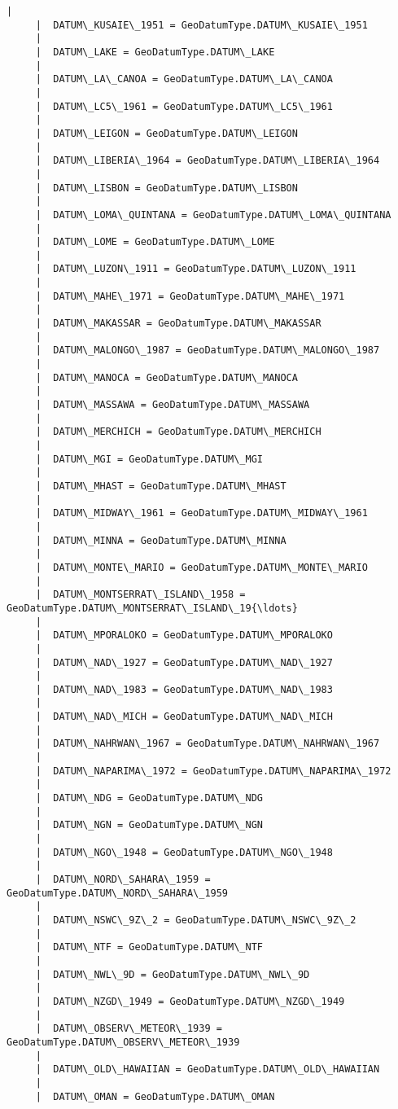 \documentclass[11pt]{article}
\begin{document}
\begin{Verbatim}[commandchars=\\\{\}]
     |  
     |  DATUM\_KUSAIE\_1951 = GeoDatumType.DATUM\_KUSAIE\_1951
     |  
     |  DATUM\_LAKE = GeoDatumType.DATUM\_LAKE
     |  
     |  DATUM\_LA\_CANOA = GeoDatumType.DATUM\_LA\_CANOA
     |  
     |  DATUM\_LC5\_1961 = GeoDatumType.DATUM\_LC5\_1961
     |  
     |  DATUM\_LEIGON = GeoDatumType.DATUM\_LEIGON
     |  
     |  DATUM\_LIBERIA\_1964 = GeoDatumType.DATUM\_LIBERIA\_1964
     |  
     |  DATUM\_LISBON = GeoDatumType.DATUM\_LISBON
     |  
     |  DATUM\_LOMA\_QUINTANA = GeoDatumType.DATUM\_LOMA\_QUINTANA
     |  
     |  DATUM\_LOME = GeoDatumType.DATUM\_LOME
     |  
     |  DATUM\_LUZON\_1911 = GeoDatumType.DATUM\_LUZON\_1911
     |  
     |  DATUM\_MAHE\_1971 = GeoDatumType.DATUM\_MAHE\_1971
     |  
     |  DATUM\_MAKASSAR = GeoDatumType.DATUM\_MAKASSAR
     |  
     |  DATUM\_MALONGO\_1987 = GeoDatumType.DATUM\_MALONGO\_1987
     |  
     |  DATUM\_MANOCA = GeoDatumType.DATUM\_MANOCA
     |  
     |  DATUM\_MASSAWA = GeoDatumType.DATUM\_MASSAWA
     |  
     |  DATUM\_MERCHICH = GeoDatumType.DATUM\_MERCHICH
     |  
     |  DATUM\_MGI = GeoDatumType.DATUM\_MGI
     |  
     |  DATUM\_MHAST = GeoDatumType.DATUM\_MHAST
     |  
     |  DATUM\_MIDWAY\_1961 = GeoDatumType.DATUM\_MIDWAY\_1961
     |  
     |  DATUM\_MINNA = GeoDatumType.DATUM\_MINNA
     |  
     |  DATUM\_MONTE\_MARIO = GeoDatumType.DATUM\_MONTE\_MARIO
     |  
     |  DATUM\_MONTSERRAT\_ISLAND\_1958 = GeoDatumType.DATUM\_MONTSERRAT\_ISLAND\_19{\ldots}
     |  
     |  DATUM\_MPORALOKO = GeoDatumType.DATUM\_MPORALOKO
     |  
     |  DATUM\_NAD\_1927 = GeoDatumType.DATUM\_NAD\_1927
     |  
     |  DATUM\_NAD\_1983 = GeoDatumType.DATUM\_NAD\_1983
     |  
     |  DATUM\_NAD\_MICH = GeoDatumType.DATUM\_NAD\_MICH
     |  
     |  DATUM\_NAHRWAN\_1967 = GeoDatumType.DATUM\_NAHRWAN\_1967
     |  
     |  DATUM\_NAPARIMA\_1972 = GeoDatumType.DATUM\_NAPARIMA\_1972
     |  
     |  DATUM\_NDG = GeoDatumType.DATUM\_NDG
     |  
     |  DATUM\_NGN = GeoDatumType.DATUM\_NGN
     |  
     |  DATUM\_NGO\_1948 = GeoDatumType.DATUM\_NGO\_1948
     |  
     |  DATUM\_NORD\_SAHARA\_1959 = GeoDatumType.DATUM\_NORD\_SAHARA\_1959
     |  
     |  DATUM\_NSWC\_9Z\_2 = GeoDatumType.DATUM\_NSWC\_9Z\_2
     |  
     |  DATUM\_NTF = GeoDatumType.DATUM\_NTF
     |  
     |  DATUM\_NWL\_9D = GeoDatumType.DATUM\_NWL\_9D
     |  
     |  DATUM\_NZGD\_1949 = GeoDatumType.DATUM\_NZGD\_1949
     |  
     |  DATUM\_OBSERV\_METEOR\_1939 = GeoDatumType.DATUM\_OBSERV\_METEOR\_1939
     |  
     |  DATUM\_OLD\_HAWAIIAN = GeoDatumType.DATUM\_OLD\_HAWAIIAN
     |  
     |  DATUM\_OMAN = GeoDatumType.DATUM\_OMAN

\end{Verbatim}
\end{document}
